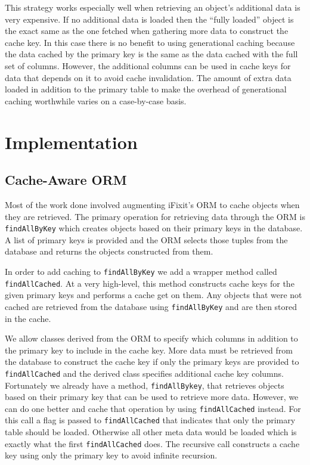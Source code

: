 \documentclass[12pt]{ucthesis}
\begin{document}
This strategy works especially well when retrieving an object's additional data is very expensive.
If no additional data is loaded then the ``fully loaded'' object is the exact same as the one fetched when gathering more data to construct the cache key.
In this case there is no benefit to using generational caching because the data cached by the primary key is the same as the data cached with the full set of columns.
However, the additional columns can be used in cache keys for data that depends on it to avoid cache invalidation.
The amount of extra data loaded in addition to the primary table to make the overhead of generational caching worthwhile varies on a case-by-case basis.

\section{Implementation}
\subsection{Cache-Aware ORM}
Most of the work done involved augmenting iFixit's ORM to cache objects when they are retrieved.
The primary operation for retrieving data through the ORM is {\tt findAllByKey} which creates objects based on their primary keys in the database.
A list of primary keys is provided and the ORM selects those tuples from the database and returns the objects constructed from them.

In order to add caching to {\tt findAllByKey} we add a wrapper method called {\tt findAllCached}.
At a very high-level, this method constructs cache keys for the given primary keys and performs a cache get on them.
Any objects that were not cached are retrieved from the database using {\tt findAllByKey} and are then stored in the cache.

We allow classes derived from the ORM to specify which columns in addition to the primary key to include in the cache key.
More data must be retrieved from the database to construct the cache key if only the primary keys are provided to {\tt findAllCached} and the derived class specifies additional cache key columns.
Fortunately we already have a method, {\tt findAllBykey}, that retrieves objects based on their primary key that can be used to retrieve more data.
However, we can do one better and cache that operation by using {\tt findAllCached} instead.
For this call a flag is passed to {\tt findAllCached} that indicates that only the primary table should be loaded.
Otherwise all other meta data would be loaded which is exactly what the first {\tt findAllCached} does.
The recursive call constructs a cache key using only the primary key to avoid infinite recursion.
\end{document}
